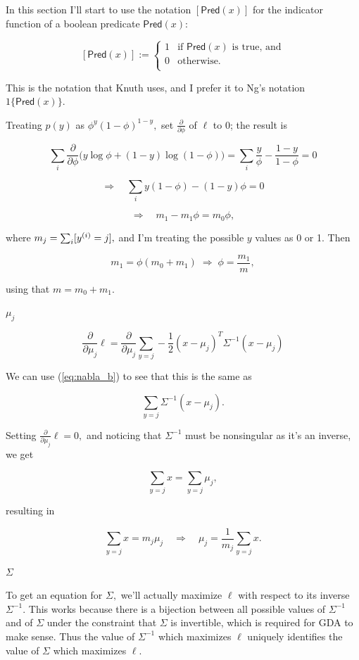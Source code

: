 \documentclass[]{article}
\begin{document}
\newcommand{\pd}[1]{\frac{\partial}{\partial #1}}

In this section I'll start to use the notation \([\textsf{Pred}(x)]\)
for the indicator function of a boolean predicate \(\textsf{Pred}(x):\)

\[[\textsf{Pred}(x)] := \begin{cases}
1 & \text{if }\textsf{Pred}(x)\text{ is true, and} \\
0 & \text{otherwise.} \\
\end{cases}\]

This is the notation that Knuth uses, and I prefer it to Ng's notation
\(1\{\textsf{Pred}(x)\}.\)

Treating \(p(y)\) as \(\phi^y(1-\phi)^{1-y},\) set \(\pd{\phi}\) of
\(\ell\) to 0; the result is

\[\sum_i\pd\phi\big(y\log\phi + (1-y)\log(1-\phi)\big)
= \sum_i \frac{y}{\phi} - \frac{1-y}{1-\phi} = 0\]

\[\Rightarrow\quad \sum_i y(1-\phi) - (1-y)\phi = 0\]

\[\Rightarrow\quad m_1 - m_1\phi = m_0\phi,\]

where \(m_j = \sum_i [y^{(i)} = j],\) and I'm treating the possible \(y\)
values as 0 or 1. Then

\[m_1 = \phi(m_0 + m_1) \;\Rightarrow\; \phi = \frac{m_1}{m},\]

using that \(m = m_0 + m_1.\)

\(\mu_j\)

\newcommand{\Sinv}{\Sigma^{-1}}

\[\pd{\mu_j}\ell = \pd{\mu_j}\sum_{y=j}-\frac{1}{2}(x-\mu_j)^T\Sinv(x-\mu_j)\]

We can use (\ref{eq:nabla_b}) to see that this is the same as

\[\sum_{y=j} \Sinv(x-\mu_j).\]

Setting \(\pd{\mu_j}\ell = 0,\) and noticing that \(\Sinv\) must be
nonsingular as it's an inverse, we get

\[\sum_{y=j} x = \sum_{y=j} \mu_j,\]

resulting in

\[
\sum_{y=j} x = m_j \mu_j \quad \Rightarrow \quad
\mu_j = \frac{1}{m_j}\sum_{y=j}x
.\]

\(\Sigma\)

To get an equation for \(\Sigma,\) we'll actually maximize \(\ell\) with
respect to its inverse \(\Sinv.\) This works because there is a
bijection between all possible values of \(\Sinv\) and of \(\Sigma\)
under the constraint that \(\Sigma\) is invertible, which is required
for GDA to make sense. Thus the value of \(\Sinv\) which maximizes
\(\ell\) uniquely identifies the value of \(\Sigma\) which maximizes
\(\ell.\)
\end{document}
